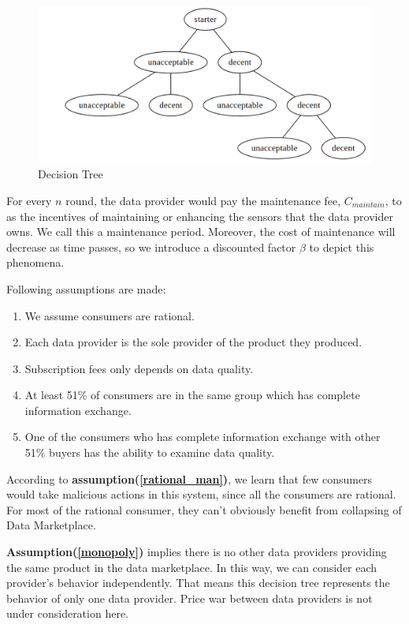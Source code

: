 \documentclass[journal,article,applsci,submit,moreauthors,pdftex]{Definitions/mdpi}
\begin{document}
\begin{figure}[H] \centering \includegraphics[width=3.3 in]{decision_tree} \caption{Decision Tree}
    \label{fig:decision_tree} \end{figure}
For every $n$ round, the data provider would pay the maintenance fee, $C_{maintain}$, to as the incentives of maintaining or enhancing the sensors that the data provider owns. We call this a maintenance period. Moreover, the cost of maintenance will decrease as time passes, so we introduce a discounted factor $\beta$ to depict this phenomena.

Following assumptions are made:
\begin{enumerate}
    \item  We assume consumers are rational. \label{rational_man}
    \item  Each data provider is the sole provider of the product they produced. \label{monopoly}
    \item  Subscription fees only depends on data quality. \label{fee_vs_quality}
    \item  At least 51\% of consumers are in the same group which has complete information exchange.\label{51_in_group}
    \item  One of the consumers who has complete information exchange with other 51\% buyers has the ability to examine data quality. \label{1_in_51}
\end{enumerate}

According to \textbf{assumption(\ref{rational_man})}, we learn that few consumers would take malicious actions in this system, since all the consumers are rational. For most of the rational consumer, they can't obviously benefit from collapsing of Data Marketplace.

\textbf{Assumption(\ref{monopoly})} implies there is no other data providers providing the same product in the data marketplace. In this way, we can consider each provider's behavior independently. That means this decision tree represents the behavior of only one data provider. Price war between data providers is not under consideration here.
\end{document}
